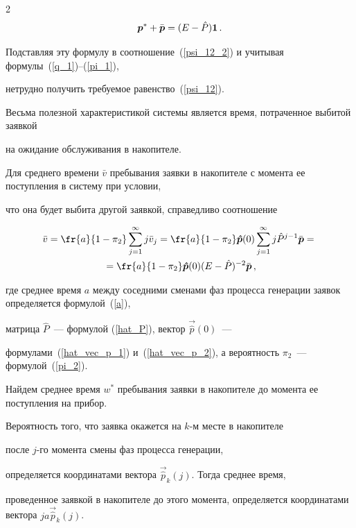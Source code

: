 \begin{multicols}{2}
$$


\vec{p}^* + \bar{\vec{p}}=(E-\hat P){\bf 1}\,.


$$


Подставляя эту формулу в соотношение~(\ref{psi_12_2}) и учитывая формулы~(\ref{q_1})--(\ref{pi_1}),


нетрудно получить требуемое равенство~(\ref{psi_12}).








Весьма полезной характеристикой системы является время, потраченное выбитой заявкой


на ожидание обслуживания в накопителе.


Для среднего времени $\bar v$ пребывания заявки в накопителе с момента ее поступления в систему при условии,


что она будет выбита другой заявкой, справедливо соотношение


\begin{multline*}


\bar v =\fr{a}{1-\pi_2} \sum_{j=1}^{\infty}j\bar v_j =


\fr{a}{ 1-\pi_2} \vec{\hat p}(0) \sum_{j=1}^{\infty} j\hat P^{j-1} \bar{\vec{p}}={}\\


{}=


\fr{a}{ 1- \pi_2} \vec{\hat p}(0) (E-\hat P)^{-2} \bar{\vec{p}}\,,


\end{multline*}


где среднее время $a$ между соседними сменами фаз процесса генерации заявок определяется формулой~(\ref{a}),


матрица $\hat P$~--- формулой (\ref{hat_P}), вектор $\vec{\hat p}(0)$~---


формулами~(\ref{hat_vec_p_1}) и~(\ref{hat_vec_p_2}), а вероятность $\pi_2$~---  формулой~(\ref{pi_2}).





Найдем среднее время $w^*$ пребывания заявки в накопителе до момента ее поступления на прибор.


Вероятность того, что заявка окажется на $k$-м месте в накопителе


после \mbox{$j$-го} момента смены фаз процесса генерации,


определяется координатами вектора $\vec{\hat p}_k(j)$. Тогда среднее время,


проведенное заявкой в накопителе до этого момента, определяется координатами вектора $ja\vec{\hat p}_k(j)$.






\end{multicols}
